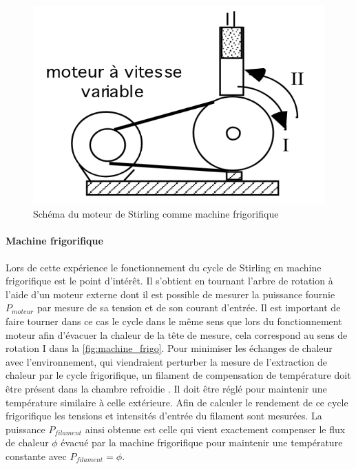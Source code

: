 \begin{figure}
    \centering
    \vspace{-1cm}
    \includegraphics[width=\linewidth]{figures/machine-frigo.png}
    \caption{Schéma du moteur de Stirling comme machine frigorifique \cite{notice}}
    \label{fig:machine_frigo}
    \vspace{-0.5cm}
\end{figure}

\paragraph*{Machine frigorifique}
Lors de cette expérience le fonctionnement du cycle de Stirling en machine frigorifique est le point d'intérêt. Il s'obtient en tournant l'arbre de rotation à l'aide d'un moteur externe dont il est possible de mesurer la puissance fournie \(P_{moteur}\) par mesure de sa tension et de son courant d'entrée. Il est important de faire tourner dans ce cas le cycle dans le même sens que lors du fonctionnement moteur afin d'évacuer la chaleur de la tête de mesure, cela correspond au sens de rotation I dans la \autoref{fig:machine_frigo}. Pour minimiser les échanges de chaleur avec l'environnement, qui viendraient perturber la mesure de l'extraction de chaleur par le cycle frigorifique, un filament de compensation de température doit être présent dans la chambre refroidie \cite{notice}. Il doit être réglé pour maintenir une température similaire à celle extérieure. Afin de calculer le rendement de ce cycle frigorifique les tensions et intensités d'entrée du filament sont mesurées. La puissance \(P_{filament}\) ainsi obtenue est celle qui vient exactement compenser le flux de chaleur \(\phi\) évacué par la machine frigorifique pour maintenir une température constante avec \(P_{filament} = \phi\).
